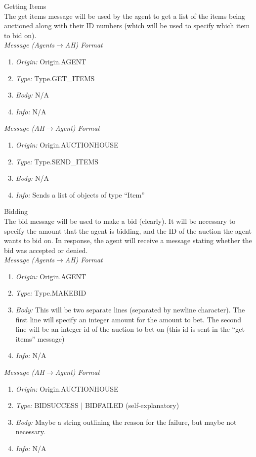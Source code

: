 \documentclass{article}
\begin{document}
\large 
Getting Items 
\normalsize
\\The get items message will be used by the agent to get a list of the items being auctioned along with their ID numbers (which will be used to specify which item to bid on). 
\footnotesize
\\\emph{Message (Agents$\to$AH) Format} 
\begin{enumerate}
	\item[]\emph{Origin:} Origin.AGENT 
	\item[]\emph{Type: } Type.GET\_ITEMS
	\item[]\emph{Body: } N/A
	\item[]\emph{Info: } N/A 
\end{enumerate} 
\emph{Message (AH$\to$Agent) Format} 
\begin{enumerate}
	\item[]\emph{Origin:} Origin.AUCTIONHOUSE
	\item[]\emph{Type:} Type.SEND\_ITEMS
	\item[]\emph{Body:} N/A
	\item[]\emph{Info:} Sends a list of objects of type ``Item'' 
\end{enumerate} 

\vspace{1cm} 

\large
Bidding 
\normalsize
\\ The bid message will be used to make a bid (clearly). It will be necessary to specify the amount that the agent is bidding, and the ID of the auction the agent wants to bid on. In response, the agent will receive a message stating whether the bid was accepted or denied. 
\footnotesize
\\\emph{Message (Agents$\to$AH) Format} 
\begin{enumerate} 
	\item[]\emph{Origin:} Origin.AGENT
	\item[]\emph{Type: } Type.MAKEBID 
	\item[]\emph{Body: } This will be two separate lines (separated by newline character). The first line will specify an integer amount for the amount to bet. The second line will be an integer id of the auction to bet on (this id is sent in the ``get items'' message)
	\item[]\emph{Info:} N/A 
\end{enumerate}
\emph{Message (AH$\to$Agent) Format} 
\begin{enumerate}
	\item[]\emph{Origin:} Origin.AUCTIONHOUSE
	\item[]\emph{Type:} BIDSUCCESS | BIDFAILED (self-explanatory) 
	\item[]\emph{Body:} Maybe a string outlining the reason for the failure, but maybe not necessary. 
	\item[]\emph{Info:} N/A 
\end{enumerate} 
\end{document}
